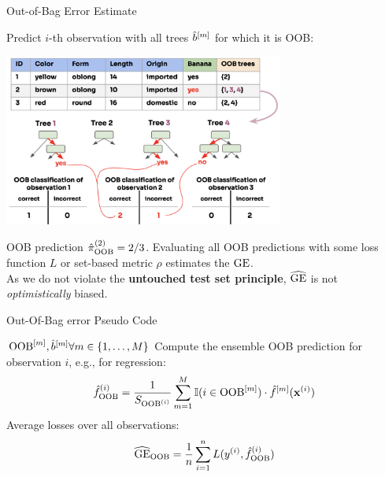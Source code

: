 \documentclass[11pt,compress,t,notes=noshow,xcolor=table]{beamer}
\begin{document}
\begin{vbframe}{Out-of-Bag Error Estimate}

Predict $i$-th observation with all trees $\hat{b}^{[m]}$ for which it is OOB:

\begin{center}
\includegraphics[width=0.69\textwidth]{figure_man/forest-oob-error.png}
\end{center}

OOB prediction $\hat{\pi}^{(2)}_{\mathrm{OOB}} = 2/3$.
Evaluating all OOB predictions with some loss function $L$ or set-based metric $\rho$ estimates the $\mathrm{GE}$.\\
As we do not violate the \textbf{untouched test set principle}, $\widehat{\mathrm{GE}}$ is not \textit{optimistically} biased.%
\end{vbframe}

\begin{vbframe}{Out-Of-Bag error Pseudo Code}
\begin{algorithm}[H]
  \footnotesize
  \caption*{Out-Of-Bag error estimation}
  \begin{algorithmic}[1]
     $\mathrm{OOB}^{[m]}, \hat{b}^{[m]} \forall m \in \{1, \dots, M\}$
      \State Compute the ensemble OOB prediction for observation $i$, e.g., for regression:
      $$\hat{f}^{(i)}_{\mathrm{OOB}} =
      \frac{1}{S_{\mathrm{OOB}^{(i)}}} \sum\limits_{m=1}^M
      \mathbb{I}(i \in \mathrm{OOB}^{[m]}) \cdot \hat{f}^{[m]}(\mathbf{x}^{(i)}) $$
    \EndFor
    \State Average losses over all observations: $$\widehat{\mathrm{GE}}_{\mathrm{OOB}} = \frac{1}{n} \sum\limits_{i=1}^n L(y^{(i)}, \hat{f}^{(i)}_{\mathrm{OOB}})$$

  \end{algorithmic}
\end{algorithm}
\end{vbframe}
\end{document}
